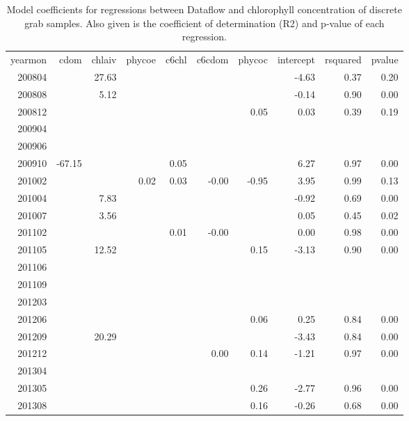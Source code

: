 \begin{table}
\caption{Model coefficients for regressions between Dataflow and chlorophyll concentration of discrete grab samples. Also given is the coefficient of determination (R2) and p-value of each regression.}
\label{tab:2}       %
\begin{tabular}{rrrrrrrrrr}
\hline\noalign{\smallskip}
yearmon & cdom & chlaiv & phycoe & c6chl & c6cdom & phycoc & intercept & rsquared & pvalue \\ 
\noalign{\smallskip}\hline\noalign{\smallskip}
 200804 &  & 27.63 &  &  &  &  & -4.63 & 0.37 & 0.20 \\ 
 200808 &  & 5.12 &  &  &  &  & -0.14 & 0.90 & 0.00 \\ 
 200812 &  &  &  &  &  & 0.05 & 0.03 & 0.39 & 0.19 \\ 
 200904 &  &  &  &  &  &  &  &  &  \\ 
 200906 &  &  &  &  &  &  &  &  &  \\ 
 200910 & -67.15 &  &  & 0.05 &  &  & 6.27 & 0.97 & 0.00 \\ 
 201002 &  &  & 0.02 & 0.03 & -0.00 & -0.95 & 3.95 & 0.99 & 0.13 \\ 
 201004 &  & 7.83 &  &  &  &  & -0.92 & 0.69 & 0.00 \\ 
 201007 &  & 3.56 &  &  &  &  & 0.05 & 0.45 & 0.02 \\ 
 201102 &  &  &  & 0.01 & -0.00 &  & 0.00 & 0.98 & 0.00 \\ 
 201105 &  & 12.52 &  &  &  & 0.15 & -3.13 & 0.90 & 0.00 \\ 
 201106 &  &  &  &  &  &  &  &  &  \\ 
 201109 &  &  &  &  &  &  &  &  &  \\ 
 201203 &  &  &  &  &  &  &  &  &  \\ 
 201206 &  &  &  &  &  & 0.06 & 0.25 & 0.84 & 0.00 \\ 
 201209 &  & 20.29 &  &  &  &  & -3.43 & 0.84 & 0.00 \\ 
 201212 &  &  &  &  & 0.00 & 0.14 & -1.21 & 0.97 & 0.00 \\ 
 201304 &  &  &  &  &  &  &  &  &  \\ 
 201305 &  &  &  &  &  & 0.26 & -2.77 & 0.96 & 0.00 \\ 
 201308 &  &  &  &  &  & 0.16 & -0.26 & 0.68 & 0.00 \\ 

\end{tabular}
\end{table}
